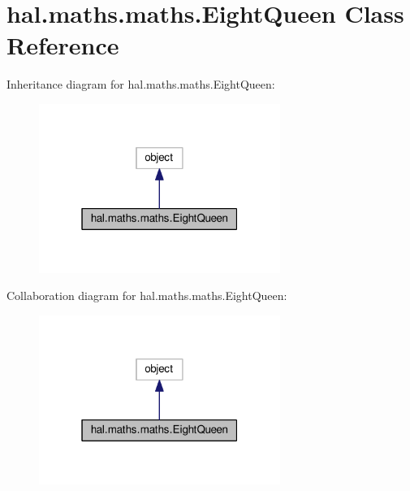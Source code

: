 \hypertarget{classhal_1_1maths_1_1maths_1_1_eight_queen}{}\section{hal.\+maths.\+maths.\+Eight\+Queen Class Reference}
\label{classhal_1_1maths_1_1maths_1_1_eight_queen}


Inheritance diagram for hal.\+maths.\+maths.\+Eight\+Queen\+:
\nopagebreak
\begin{figure}[H]
\begin{center}
\leavevmode
\includegraphics[width=223pt]{classhal_1_1maths_1_1maths_1_1_eight_queen__inherit__graph}
\end{center}
\end{figure}


Collaboration diagram for hal.\+maths.\+maths.\+Eight\+Queen\+:
\nopagebreak
\begin{figure}[H]
\begin{center}
\leavevmode
\includegraphics[width=223pt]{classhal_1_1maths_1_1maths_1_1_eight_queen__coll__graph}
\end{center}
\end{figure}
